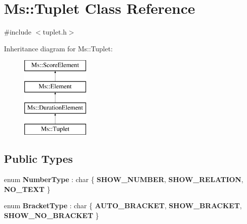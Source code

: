 \hypertarget{class_ms_1_1_tuplet}{}\section{Ms\+:\+:Tuplet Class Reference}
\label{class_ms_1_1_tuplet}


{\ttfamily \#include $<$tuplet.\+h$>$}

Inheritance diagram for Ms\+:\+:Tuplet\+:\begin{figure}[H]
\begin{center}
\leavevmode
\includegraphics[height=4.000000cm]{class_ms_1_1_tuplet}
\end{center}
\end{figure}
\subsection*{Public Types}
\begin{DoxyCompactItemize}
\item 
\mbox{\label{class_ms_1_1_tuplet_ab0c56430ac3aec8a4212eda14ad1bf43}} 
enum {\bfseries Number\+Type} \+: char \{ {\bfseries S\+H\+O\+W\+\_\+\+N\+U\+M\+B\+ER}, 
{\bfseries S\+H\+O\+W\+\_\+\+R\+E\+L\+A\+T\+I\+ON}, 
{\bfseries N\+O\+\_\+\+T\+E\+XT}
 \}
\item 
\mbox{\label{class_ms_1_1_tuplet_ac3a103fe03f9403f54096cc2d78ae627}} 
enum {\bfseries Bracket\+Type} \+: char \{ {\bfseries A\+U\+T\+O\+\_\+\+B\+R\+A\+C\+K\+ET}, 
{\bfseries S\+H\+O\+W\+\_\+\+B\+R\+A\+C\+K\+ET}, 
{\bfseries S\+H\+O\+W\+\_\+\+N\+O\+\_\+\+B\+R\+A\+C\+K\+ET}
 \}
\end{DoxyCompactItemize}
